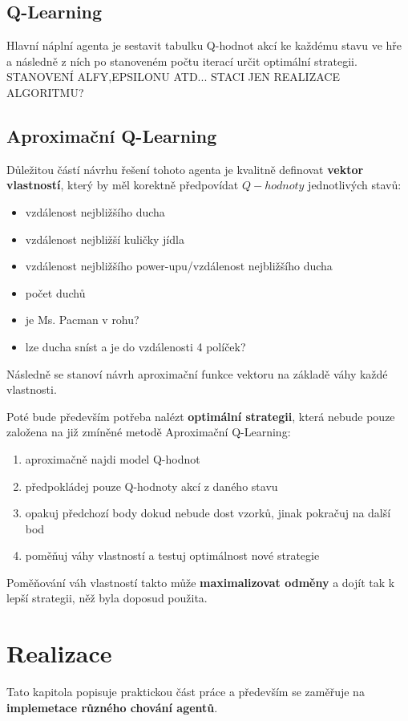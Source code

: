 \section{Q-Learning}
Hlavní náplní agenta je sestavit tabulku Q-hodnot akcí ke každému stavu ve hře a následně z ních po stanoveném počtu iterací určit optimální strategii. STANOVENÍ ALFY,EPSILONU ATD...
STACI JEN REALIZACE ALGORITMU?
\section{Aproximační Q-Learning}
Důležitou částí návrhu řešení tohoto agenta je kvalitně definovat \textbf{vektor vlastností}, který by měl korektně předpovídat $Q-hodnoty$ jednotlivých stavů:
\begin{itemize}
\item vzdálenost nejbližšího ducha
\item vzdálenost nejbližší kuličky jídla
\item vzdálenost nejbližšího power-upu/vzdálenost nejbližšího ducha
\item počet duchů
\item je Ms. Pacman v rohu?
\item lze ducha sníst a je do vzdálenosti 4 políček?
\end{itemize}
Následně se stanoví návrh aproximační funkce vektoru na základě váhy každé vlastnosti.

Poté bude především potřeba nalézt \textbf{optimální strategii}, která nebude pouze založena na již zmíněné metodě Aproximační Q-Learning:
\begin{enumerate}
\item aproximačně najdi model Q-hodnot
\item předpokládej pouze Q-hodnoty akcí z daného stavu
\item opakuj předchozí body dokud nebude dost vzorků, jinak pokračuj na další bod
\item poměňuj váhy vlastností a testuj optimálnost nové strategie
\end{enumerate}
Poměňování váh vlastností takto může \textbf{maximalizovat odměny} a dojít tak k lepší strategii, něž byla doposud použita.

\chapter{Realizace}
Tato kapitola popisuje praktickou část práce a především se zaměřuje na \textbf{implemetace různého chování agentů}.

